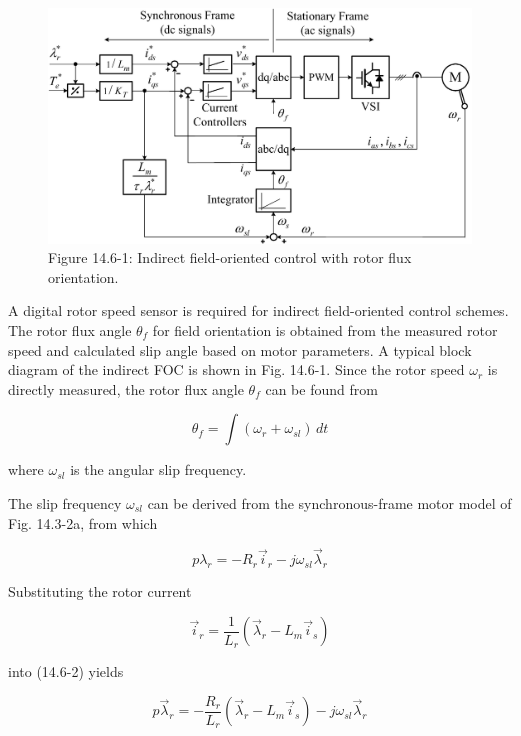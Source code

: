 \documentclass[letterpaper,12pt]{article}
\begin{document}
\begin{figure}[h]
\centering
\includegraphics{graficos/img19.jpg}
\caption{Figure 14.6-1: Indirect field-oriented control with rotor flux orientation.}
\end{figure}
\FloatBarrier

A digital rotor speed sensor is required for indirect field-oriented control schemes. The rotor flux angle $\theta_f$ for field orientation is obtained from the measured rotor speed and calculated slip angle based on motor parameters. A typical block diagram of the indirect FOC is shown in Fig. 14.6-1. Since the rotor speed $\omega_r$ is directly measured, the rotor flux angle $\theta_f$ can be found from

\begin{equation}
\theta_f = \int (\omega_r + \omega_{sl}) \, dt \tag{14.6-1}
\end{equation}

where $\omega_{sl}$ is the angular slip frequency.

The slip frequency $\omega_{sl}$ can be derived from the synchronous-frame motor model of Fig. 14.3-2a, from which

\begin{equation}
p \lambda_r = -R_r \vec{i}_r - j \omega_{sl} \vec{\lambda}_r \tag{14.6-2}
\end{equation}

Substituting the rotor current

\begin{equation}
\vec{i}_r = \frac{1}{L_r} (\vec{\lambda}_r - L_m \vec{i}_s) \tag{14.6-3}
\end{equation}

into (14.6-2) yields

\begin{equation}
p \vec{\lambda}_r = -\frac{R_r}{L_r} \left( \vec{\lambda}_r - L_m \vec{i}_s \right) - j \omega_{sl} \vec{\lambda}_r \tag{14.6-4}
\end{equation}
\end{document}

